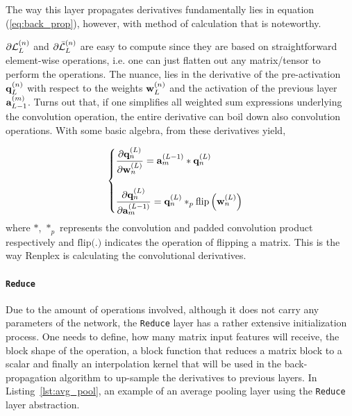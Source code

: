 The way this layer propagates derivatives fundamentally lies in equation (\ref{eq:back_prop}), however, with method of calculation that is noteworthy.

$ \partial\mathcal{L}^{(n)}_{L} $ and $ \partial\bar{\mathcal{L}}^{(n)}_{L} $ are easy to compute since they are based on straightforward element-wise operations, i.e. one can just flatten out any matrix/tensor to perform the operations. The nuance, lies in the derivative of the pre-activation $ \mathbf{q}^{(n)}_{L} $ with respect to the weights $ \mathbf{w}^{(n)}_{L} $ and the activation of the previous layer $ \mathbf{a}^{(m)}_{L-1} $.  Turns out that, if one simplifies all weighted sum expressions underlying the convolution operation, the entire derivative can boil down also convolution operations. With some basic algebra, from these derivatives yield,

\begin{equation}
	\begin{cases}
		\dfrac{\partial \mathbf{q}^{(L)}_{n}}{\partial \mathbf{w}^{(L)}_{n}} = \mathbf{a}^{(L-1)}_{m} \ast \mathbf{q}^{(L)}_{n} \\
		\\
		\dfrac{\partial \mathbf{q}^{(L)}_{n}}{\partial \mathbf{a}^{(L-1)}_{m}} = \mathbf{q}^{(L)}_{n} \ast_p \text{flip}\left( \mathbf{w}^{(L)}_{n} \right) \\
	\end{cases}
\end{equation}
where $ \ast $, $ \ast_p $ represents the convolution and padded convolution product respectively and $ \text{flip(.)} $ indicates the operation of flipping a matrix. This is the way Renplex is calculating the convolutional derivatives.

\paragraph{\texttt{Reduce}}

Due to the amount of operations involved, although it does not carry any parameters of the network, the \texttt{Reduce} layer has a rather extensive initialization process. One needs to define, how many matrix input features will receive, the block shape of the operation, a block function that reduces a matrix block to a scalar and finally an interpolation kernel that will be used in the back-propagation algorithm to up-sample the derivatives to previous layers. In Listing~\ref{lst:avg_pool}, an example of an average pooling layer using the \texttt{Reduce} layer abstraction.

